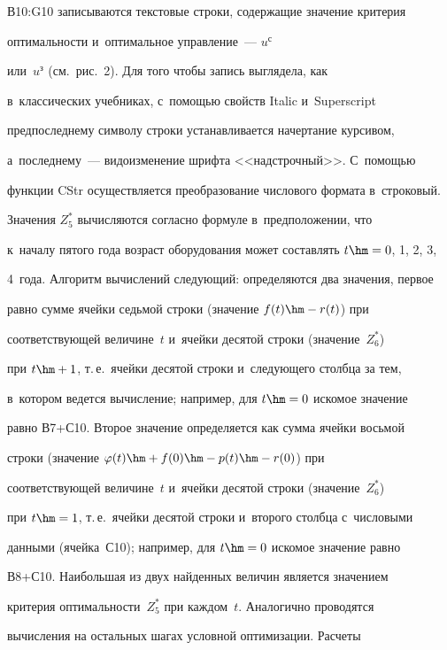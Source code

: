 В10:G10 записываются текс\-то\-вые строки, содержащие значение критерия 


оптимальности и~оптимальное управ\-ле\-ние~--- $u^{\mathrm{с}}$ 


или~$u^{\mathrm{з}}$ (см.\ рис.~2). Для того чтобы запись выглядела, как 


в~классических учебниках, с~помощью свойств Italic и~Superscript 


предпоследнему символу строки устанавливается начертание курсивом, 


а~последнему~--- видоизменение шриф\-та <<надстрочный>>. С~помощью 


функции CStr осуществляется преобразование чис\-ло\-во\-го формата в~строковый.


  


  Значения $Z^*_5$ вычисляются согласно формуле в~предположении, что 


к~началу пятого года возраст оборудования может составлять $t \hm= 0$, 1, 2, 3, 


4~года. Алгоритм вы\-чис\-ле\-ний следующий: определяются два значения, первое 


равно сумме ячейки седьмой строки (значение $ f(t)\hm- r(t)$) при 


соответствующей величине~$t$ и~ячейки десятой строки (значение~$Z_6^*$) 


при $t \hm+ 1$, т.\,е.\ ячейки десятой строки и~следующего столбца за тем, 


в~котором ведется вы\-чис\-ле\-ние; например, для $t\hm = 0$ искомое значение 


равно В7\;+\;С10. Второе значение определяется как сумма ячейки вось\-мой 


строки (значение $\varphi (t) \hm+ f(0) \hm- p(t) \hm- r(0)$) при 


соответствующей величине~$t$ и~ячейки десятой строки (значение~$Z_6^*$) 


при $t\hm = 1$, т.\,е.\ ячейки десятой строки и~второго столбца с~чис\-ло\-вы\-ми 


данными (ячейка~С10); например, для $t\hm = 0$ искомое значение равно 


В8\;+\;С10. Наибольшая из двух найденных величин является значением 


критерия оптимальности~$Z_5^*$ при каждом~$t$. Аналогично проводятся 


вы\-чис\-ле\-ния на остальных шагах услов\-ной оптимизации. Расчеты 


